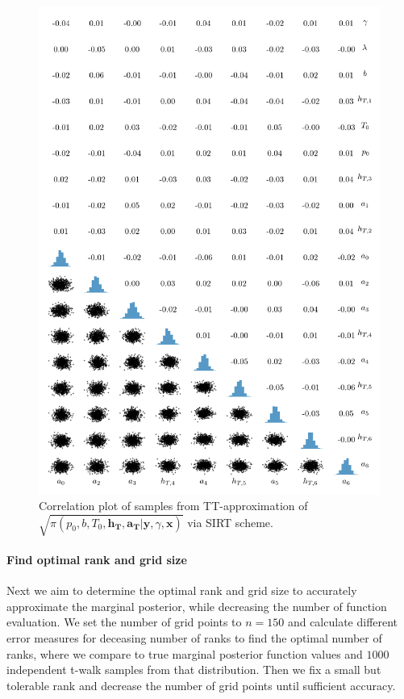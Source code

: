 \begin{figure}%
	\includegraphics[]{2ndCorrPlot.png}
	\caption*{Correlation plot of samples from TT-approximation of $\sqrt{\pi(p_0,b,T_0,\bm{h_T},\bm{a_T} | \bm{y}, \gamma, \bm{x})}$ via SIRT scheme.}
\end{figure}
\cleardoublepage


\paragraph{Find optimal rank and grid size}
Next we aim to determine the optimal rank and grid size to accurately approximate the marginal posterior, while decreasing the number of function evaluation.
We set the number of grid points to $n = 150$ and calculate different error measures for deceasing number of ranks to find the optimal number of ranks, where we compare to true marginal posterior function values and $1000$ independent t-walk samples from that distribution.
Then we fix a small but tolerable rank and decrease the number of grid points until sufficient accuracy.

